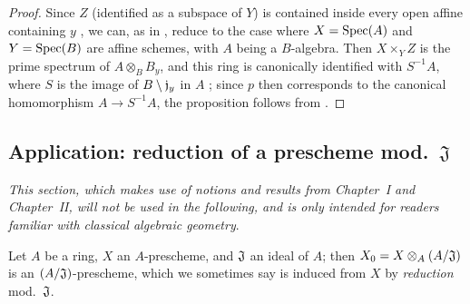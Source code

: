 \begin{proof}
\label{proof-1.3.6.5}
Since $Z$ (identified as a subspace of $Y$) is contained inside every open affine containing $y$ , we can, as in , reduce to the case where $X={\mathop{\mathrm{Spec}}\nolimits}(A)$ and $Y={\mathop{\mathrm{Spec}}\nolimits}(B)$ are affine schemes, with $A$ being a $B$-algebra.
Then $X\times_Y Z$ is the prime spectrum of $A\otimes_B B_y$, and this ring is canonically identified with $S^{-1}A$, where $S$ is the image of $B\setminus\mathfrak{j}_y$ in $A$ ; since $p$ then corresponds to the canonical homomorphism $A\to S^{-1}A$, the proposition follows from .
\end{proof}

\subsection{Application: reduction of a prescheme mod.~$\mathfrak{J}$}
\label{subsection-reduction-of-a-prescheme}

\emph{This section, which makes use of notions and results from Chapter~I and Chapter~II, will not be used in the following, and is only intended for readers familiar with classical algebraic geometry}.

\begin{env}[3.7.1]
\label{1.3.7.1}
Let $A$ be a ring, $X$ an $A$-prescheme, and $\mathfrak{J}$ an ideal of $A$; then $X_0=X\otimes_A(A/\mathfrak{J})$ is an $(A/\mathfrak{J})$-prescheme, which we sometimes say is induced from $X$ by \emph{reduction} mod.~$\mathfrak{J}$.
\end{env}

